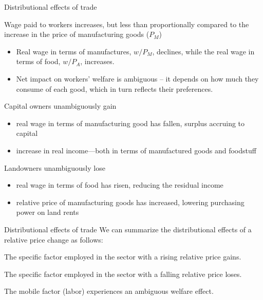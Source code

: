 \documentclass[notes,11pt, aspectratio=169, xcolor=table]{beamer}
\newenvironment{wideitemize}{\itemize\addtolength{\itemsep}{10pt}}{\enditemize}
\begin{document}
\begin{frame}{Distributional effects of trade}
    \begin{wideitemize}
    \item Wage paid to workers increases, but less than proportionally compared to the increase in the price of manufacturing goods ($P_M$)
    \begin{itemize}
        \item Real wage in terms of manufactures, $w/P_M$, declines, while the real wage in terms of food, $w/P_A$, increases. 
        \item Net impact on workers' welfare is ambiguous -- it depends on how much they consume of each good, which in turn reflects their preferences. 
    \end{itemize}
    \item<2-> Capital owners unambiguously gain
    \begin{itemize}
        \item real wage in terms of manufacturing good has fallen, surplus accruing to capital
        \item increase in real income—both in terms of manufactured goods and foodstuff
    \end{itemize}
    \item<3-> Landowners unambiguously lose
    \begin{itemize}
        \item real wage in terms of food has risen, reducing the residual income
        \item relative price of manufacturing goods has increased, lowering purchasing power on land rents
    \end{itemize}

    \end{wideitemize}
\end{frame}


\begin{frame}{Distributional effects of trade}
    We can summarize the distributional effects of a relative price change as follows:
    \vspace{12pt}
    \begin{wideitemize}
        \item The specific factor employed in the sector with a rising relative price gains.
        \item The specific factor employed in the sector with a falling relative price loses.
        \item The mobile factor (labor) experiences an ambiguous welfare effect.
    \end{wideitemize}
\end{frame}
\end{document}
